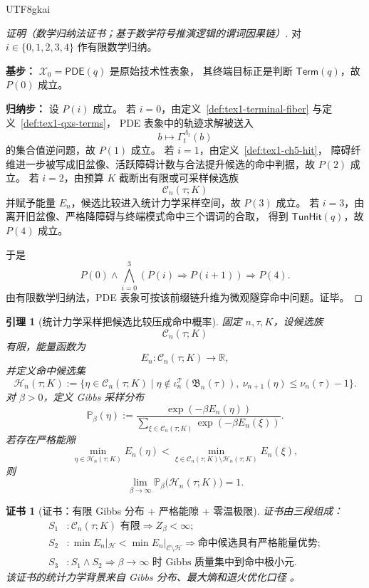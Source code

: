 \documentclass[12pt]{article}
\newtheorem{lemma}{引理}[section]
\newtheorem{Certificate}{证书}[section]
\newcommand{\RR}{\mathbb{R}}
\begin{document}
\begin{CJK*}{UTF8}{gkai}
\begin{proof}[证明（数学归纳法证书；基于数学符号推演逻辑的谓词因果链）]
对 \(i\in\{0,1,2,3,4\}\) 作有限数学归纳。

\textbf{基步：}
\(\mathcal X_0=\mathsf{PDE}(q)\) 是原始技术性表象，
其终端目标正是判断 \(\mathsf{Term}(q)\)，故 \(P(0)\) 成立。

\textbf{归纳步：}
设 \(P(i)\) 成立。
若 \(i=0\)，由定义~\ref{def:tex1-terminal-fiber} 与定义~\ref{def:tex1-qxs-terms}，
PDE 表象中的轨迹求解被送入
\[
  b\longmapsto\Gamma_t^{\Lambda_t}(b)
\]
的集合值逆问题，故 \(P(1)\) 成立。
若 \(i=1\)，由定义~\ref{def:tex1-ch5-hit}，
障碍纤维进一步被写成旧盆像、活跃障碍计数与合法提升候选的命中判据，故 \(P(2)\) 成立。
若 \(i=2\)，由预算 \(K\) 截断出有限或可采样候选族
\[
  \mathcal C_n(\tau;K)
\]
并赋予能量 \(E_n\)，候选比较进入统计力学采样空间，故 \(P(3)\) 成立。
若 \(i=3\)，由离开旧盆像、严格降障碍与终端模式命中三个谓词的合取，
得到 \(\mathsf{TunHit}(q)\)，故 \(P(4)\) 成立。

于是
\[
  P(0)\wedge
  \bigwedge_{i=0}^{3}(P(i)\Rightarrow P(i+1))
  \Longrightarrow
  P(4).
\]
由有限数学归纳法，PDE 表象可按该前缀链升维为微观隧穿命中问题。证毕。
\end{proof}

\begin{lemma}[统计力学采样把候选比较压成命中概率]
\label{lem:tex1-ch5-stat-hit}
固定 \(n,\tau,K\)，设候选族
\[
  \mathcal C_n(\tau;K)
\]
有限，能量函数为
\[
  E_n:\mathcal C_n(\tau;K)\to\RR,
\]
并定义命中候选集
\[
  \mathcal H_n(\tau;K)
  :=
  \bigl\{
    \eta\in\mathcal C_n(\tau;K)
    \mid
    \eta\notin\iota_n^{\mathcal T}(\mathfrak B_n(\tau)),
    \ \nu_{n+1}(\eta)\le\nu_n(\tau)-1
  \bigr\}.
\]
对 \(\beta>0\)，定义 Gibbs 采样分布
\[
  \mathbb P_\beta(\eta)
  :=
  \frac{\exp(-\beta E_n(\eta))}
       {\sum_{\xi\in\mathcal C_n(\tau;K)}\exp(-\beta E_n(\xi))}.
\]
若存在严格能隙
\[
  \min_{\eta\in\mathcal H_n(\tau;K)}E_n(\eta)
  <
  \min_{\xi\in\mathcal C_n(\tau;K)\setminus\mathcal H_n(\tau;K)}E_n(\xi),
\]
则
\[
  \lim_{\beta\to\infty}
  \mathbb P_\beta\bigl(\mathcal H_n(\tau;K)\bigr)=1.
\]
\end{lemma}

\begin{Certificate}[证书：有限 Gibbs 分布 + 严格能隙 + 零温极限]
\label{cert:tex1-ch5-stat-hit}
证书由三段组成：
\[
\begin{aligned}
  S_1 &: \mathcal C_n(\tau;K)\text{ 有限}
        \Rightarrow Z_\beta<\infty;\\
  S_2 &: \min E_n|_{\mathcal H}
        <
        \min E_n|_{\mathcal C\setminus\mathcal H}
        \Rightarrow
        \text{命中候选具有严格能量优势};\\
  S_3 &: S_1\wedge S_2
        \Rightarrow
        \beta\to\infty\text{ 时 Gibbs 质量集中到命中极小元}.
\end{aligned}
\]
该证书的统计力学背景来自 Gibbs 分布、最大熵和退火优化口径
\cite{Gibbs1902Elementary,Jaynes1957Information,Kirkpatrick1983Optimization,GemanGeman1984StochasticRelaxation}。
\end{Certificate}


\end{CJK*}
\end{document}
